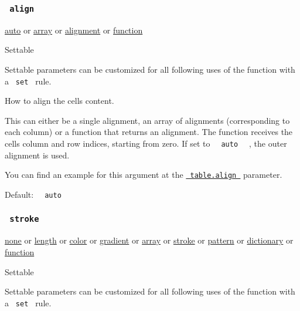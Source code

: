 \subsubsection{\texorpdfstring{\texttt{\ align\ }}{ align }}\label{parameters-align}

\href{/docs/reference/foundations/auto/}{auto} {or}
\href{/docs/reference/foundations/array/}{array} {or}
\href{/docs/reference/layout/alignment/}{alignment} {or}
\href{/docs/reference/foundations/function/}{function}

{{ Settable }}

\label{parameters-align-settable-tooltip}
Settable parameters can be customized for all following uses of the
function with a \texttt{\ set\ } rule.

How to align the cells\textquotesingle{} content.

This can either be a single alignment, an array of alignments
(corresponding to each column) or a function that returns an alignment.
The function receives the cells\textquotesingle{} column and row
indices, starting from zero. If set to
\texttt{\ }{\texttt{\ auto\ }}\texttt{\ } , the outer alignment is used.

You can find an example for this argument at the
\href{/docs/reference/model/table/\#parameters-align}{\texttt{\ table.align\ }}
parameter.

Default: \texttt{\ }{\texttt{\ auto\ }}\texttt{\ }

\subsubsection{\texorpdfstring{\texttt{\ stroke\ }}{ stroke }}\label{parameters-stroke}

\href{/docs/reference/foundations/none/}{none} {or}
\href{/docs/reference/layout/length/}{length} {or}
\href{/docs/reference/visualize/color/}{color} {or}
\href{/docs/reference/visualize/gradient/}{gradient} {or}
\href{/docs/reference/foundations/array/}{array} {or}
\href{/docs/reference/visualize/stroke/}{stroke} {or}
\href{/docs/reference/visualize/pattern/}{pattern} {or}
\href{/docs/reference/foundations/dictionary/}{dictionary} {or}
\href{/docs/reference/foundations/function/}{function}

{{ Settable }}

\label{parameters-stroke-settable-tooltip}
Settable parameters can be customized for all following uses of the
function with a \texttt{\ set\ } rule.

